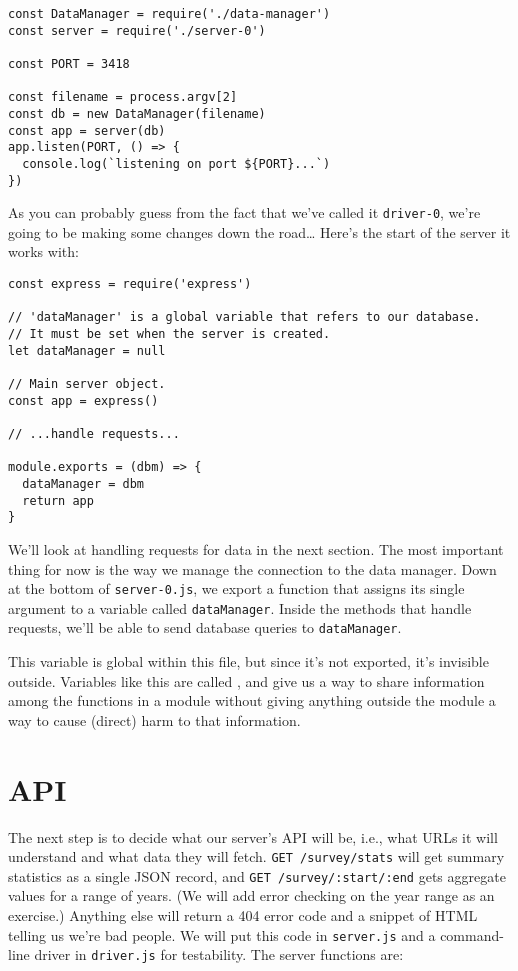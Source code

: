 \begin{verbatim}
const DataManager = require('./data-manager')
const server = require('./server-0')

const PORT = 3418

const filename = process.argv[2]
const db = new DataManager(filename)
const app = server(db)
app.listen(PORT, () => {
  console.log(`listening on port ${PORT}...`)
})
\end{verbatim}

\noindent
As you can probably guess from the fact that we've called it \texttt{driver-0},
we're going to be making some changes down the road{\ldots}
Here's the start of the server it works with:

\begin{verbatim}
const express = require('express')

// 'dataManager' is a global variable that refers to our database.
// It must be set when the server is created.
let dataManager = null

// Main server object.
const app = express()

// ...handle requests...

module.exports = (dbm) => {
  dataManager = dbm
  return app
}
\end{verbatim}

We'll look at handling requests for data in the next section.
The most important thing for now is the way we manage the connection to the data manager.
Down at the bottom of \texttt{server-0.js},
we export a function that assigns its single argument to a variable called \texttt{dataManager}.
Inside the methods that handle requests,
we'll be able to send database queries to \texttt{dataManager}.

This variable is global within this file,
but since it's not exported,
it's invisible outside.
Variables like this are called ,
and give us a way to share information among the functions in a module
without giving anything outside the module a way to cause (direct) harm to that information.

\section{API}\label{s:capstone-api}

The next step is to decide what our server's API will be,
i.e.,
what URLs it will understand and what data they will fetch.
\texttt{GET /survey/stats} will get summary statistics as a single JSON record,
and \texttt{GET /survey/:start/:end} gets aggregate values for a range of years.
(We will add error checking on the year range as an exercise.)
Anything else will return a 404 error code and a snippet of HTML telling us we're bad people.
We will put this code in \texttt{server.js} and a command-line driver in \texttt{driver.js} for testability.
The server functions are:

